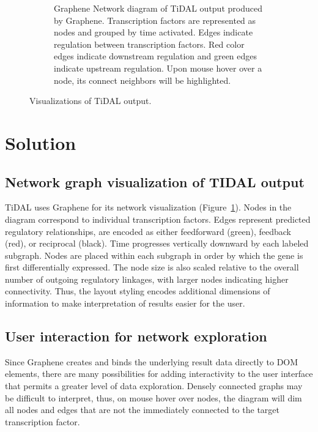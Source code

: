 \begin{figure}
\begin{subfigure}[b]{\textwidth}
    \caption{
      Graphene Network diagram of TiDAL output produced by Graphene.
      Transcription factors are represented as nodes and grouped by time activated.
      Edges indicate regulation between transcription factors.
      Red color edges indicate downstream regulation and green edges indicate upstream regulation.
      Upon  mouse hover over a node, its connect neighbors will be highlighted.
    }
    \label{Figure:tidal-output-graphene}
  \end{subfigure}
  \caption{Visualizations of TiDAL output.}
  \label{fig:tidal-output}
\end{figure}

\section{Solution}
\subsection{Network graph visualization of TIDAL output}

TiDAL uses Graphene for its network visualization (Figure~\ref{Figure:tidal-output-graphene}).
Nodes in the diagram correspond to individual transcription factors.
Edges represent predicted regulatory relationships, are encoded as either feedforward (green), feedback (red), or reciprocal (black).
Time progresses vertically downward by each labeled subgraph. 
Nodes are placed within each subgraph in order by which the gene is first differentially expressed.
The node size is also scaled relative to the overall number of outgoing regulatory linkages, with larger nodes indicating higher connectivity.
Thus, the layout styling encodes additional dimensions of information to make interpretation of results easier for the user.

\subsection{User interaction for network exploration}

Since Graphene creates and binds the underlying result data directly to DOM elements, there are many possibilities for adding interactivity to the user interface that permits a greater level of data exploration.
Densely connected graphs may be difficult to interpret, thus, on mouse hover over nodes, the diagram will dim all nodes and edges that are not the immediately connected to the target transcription factor.


